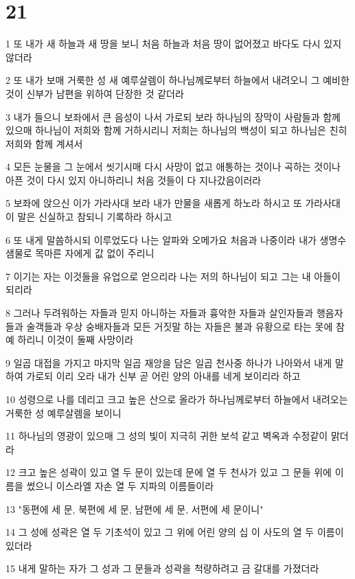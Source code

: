 \chapter{21}

\par 1 또 내가 새 하늘과 새 땅을 보니 처음 하늘과 처음 땅이 없어졌고 바다도 다시 있지 않더라
\par 2 또 내가 보매 거룩한 성 새 예루살렘이 하나님께로부터 하늘에서 내려오니 그 예비한 것이 신부가 남편을 위하여 단장한 것 같더라
\par 3 내가 들으니 보좌에서 큰 음성이 나서 가로되 보라 하나님의 장막이 사람들과 함께 있으매 하나님이 저희와 함께 거하시리니 저희는 하나님의 백성이 되고 하나님은 친히 저희와 함께 계셔서
\par 4 모든 눈물을 그 눈에서 씻기시매 다시 사망이 없고 애통하는 것이나 곡하는 것이나 아픈 것이 다시 있지 아니하리니 처음 것들이 다 지나갔음이러라
\par 5 보좌에 앉으신 이가 가라사대 보라 내가 만물을 새롭게 하노라 하시고 또 가라사대 이 말은 신실하고 참되니 기록하라 하시고
\par 6 또 내게 말씀하시되 이루었도다 나는 알파와 오메가요 처음과 나중이라 내가 생명수 샘물로 목마른 자에게 값 없이 주리니
\par 7 이기는 자는 이것들을 유업으로 얻으리라 나는 저의 하나님이 되고 그는 내 아들이 되리라
\par 8 그러나 두려워하는 자들과 믿지 아니하는 자들과 흉악한 자들과 살인자들과 행음자들과 술객들과 우상 숭배자들과 모든 거짓말 하는 자들은 불과 유황으로 타는 못에 참예 하리니 이것이 둘째 사망이라
\par 9 일곱 대접을 가지고 마지막 일곱 재앙을 담은 일곱 천사중 하나가 나아와서 내게 말하여 가로되 이리 오라 내가 신부 곧 어린 양의 아내를 네게 보이리라 하고
\par 10 성령으로 나를 데리고 크고 높은 산으로 올라가 하나님께로부터 하늘에서 내려오는 거룩한 성 예루살렘을 보이니
\par 11 하나님의 영광이 있으매 그 성의 빛이 지극히 귀한 보석 같고 벽옥과 수정같이 맑더라
\par 12 크고 높은 성곽이 있고 열 두 문이 있는데 문에 열 두 천사가 있고 그 문들 위에 이름을 썼으니 이스라엘 자손 열 두 지파의 이름들이라
\par 13 "동편에 세 문, 북편에 세 문, 남편에 세 문, 서편에 세 문이니"
\par 14 그 성에 성곽은 열 두 기초석이 있고 그 위에 어린 양의 십 이 사도의 열 두 이름이 있더라
\par 15 내게 말하는 자가 그 성과 그 문들과 성곽을 척량하려고 금 갈대를 가졌더라

